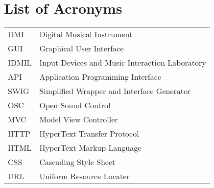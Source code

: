 \documentclass [12pt,letterpaper]{report}
\begin{document}
\pagebreak


\tableofcontents
\listoffigures

\listoftables

\newpage
\chapter*{List of Acronyms}

\begin{longtable}{ll}
    DMI 	& 	Digital Musical Instrument\\
    GUI		& 	Graphical User Interface\\
    IDMIL &   Input Devices and Music Interaction Laboratory\\ 
    API   &   Application Programming Interface\\
    SWIG  &   Simplified Wrapper and Interface Generator\\
    OSC   &   Open Sound Control\\
    MVC   &   Model View Controller\\
    HTTP  &   HyperText Transfer Protocol\\
    HTML  &   HyperText Markup Language\\
    CSS   &   Cascading Style Sheet\\
    URL   &   Uniform Resource Locater\\
\end{longtable}

\cleardoublepage
{}

%
%
\typeout{}

%
\typeout{}

%
\typeout{}

%
\typeout{}

%
\typeout{}

%
\typeout{}




%
%

\typeout{}
    \renewcommand\refname{References}
    \nocite{*}
    
\end{document}
